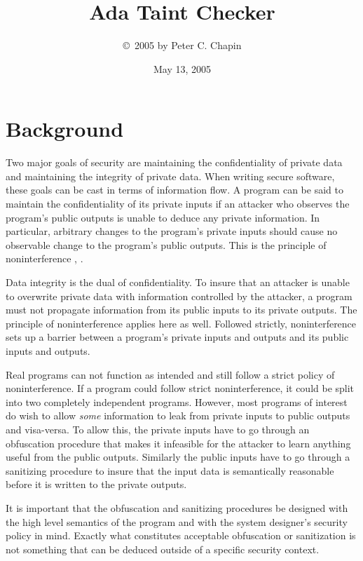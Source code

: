 \documentclass{article}
\begin{document}
\title{Ada Taint Checker}
\author{\copyright\ 2005 by Peter C. Chapin}
\date{May 13, 2005}
\maketitle

\section{Background}

Two major goals of security are maintaining the confidentiality of private data and maintaining the integrity of private data. When writing secure software, these goals can be cast in terms of information flow. A program can be said to maintain the confidentiality of its private inputs if an attacker who observes the program's public outputs is unable to deduce any private information. In particular, arbitrary changes to the program's private inputs should cause no observable change to the program's public outputs. This is the principle of noninterference \cite{Sabelfield:2003-01}, \cite{Huang:2004}.

Data integrity is the dual of confidentiality. To insure that an attacker is unable to overwrite private data with information controlled by the attacker, a program must not propagate information from its public inputs to its private outputs. The principle of noninterference applies here as well. Followed strictly, noninterference sets up a barrier between a program's private inputs and outputs and its public inputs and outputs.

Real programs can not function as intended and still follow a strict policy of noninterference. If a program could follow strict noninterference, it could be split into two completely independent programs. However, most programs of interest do wish to allow \emph{some} information to leak from private inputs to public outputs and visa-versa. To allow this, the private inputs have to go through an obfuscation procedure that makes it infeasible for the attacker to learn anything useful from the public outputs. Similarly the public inputs have to go through a sanitizing procedure to insure that the input data is semantically reasonable before it is written to the private outputs.

It is important that the obfuscation and sanitizing procedures be designed with the high level semantics of the program and with the system designer's security policy in mind. Exactly what constitutes acceptable obfuscation or sanitization is not something that can be deduced outside of a specific security context.
\end{document}

